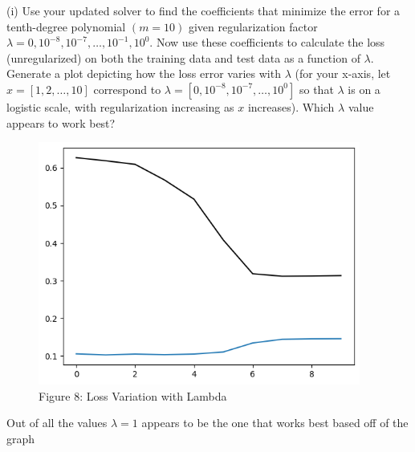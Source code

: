 \documentclass[letterpaper]{article}
\theoremstyle{definition}
\begin{document}
(i) Use your updated solver to find the coefficients that minimize the error for a tenth-degree polynomial \((m=10)\) given regularization factor \(\lambda=0,10^{-8}, 10^{-7}, \ldots, 10^{-1}, 10^{0}\). Now use these coefficients to calculate the loss (unregularized) on both the training data and test data as a function of \(\lambda\). Generate a plot depicting how the loss error varies with \(\lambda\) (for your x-axis, let \(x=[1,2, \ldots, 10]\) correspond to \(\lambda=\left[0,10^{-8}, 10^{-7}, \ldots, 10^{0}\right]\) so that \(\lambda\) is on a logistic scale, with regularization increasing as \(x\) increases). Which \(\lambda\) value appears to work best?

\begin{figure}[htbp]
\centering
\includegraphics[width=400]{../assets/hw1_fig8.png}
\caption{Figure 8: Loss Variation with Lambda}
\end{figure}

\color{teal}
Out of all the values \(\lambda = 1\) appears to be the one that works best based off of the
graph
\color{black}
\end{document}
